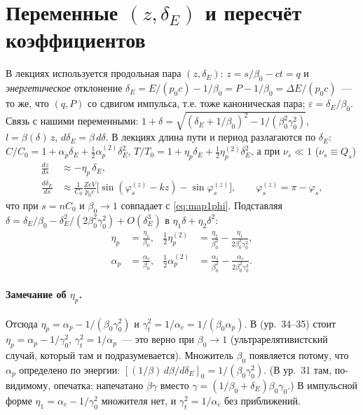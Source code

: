 \documentclass[a4paper,11pt]{article}
\numberwithin{equation}{section}
\begin{document}
\appendix
\section{Переменные $(z,\delta_E)$ и пересчёт коэффициентов}
В лекциях \cite{wolski4,wolski7} используется продольная пара $(z,\delta_E)$: $z=s/\beta_0-ct=q$ и
\emph{энергетическое} отклонение $\delta_E=E/(p_0c)-1/\beta_0=P-1/\beta_0=\Delta E/(p_0c)$~--- то же, что $(q,P)$
со сдвигом импульса, т.е. тоже каноническая пара; $\varepsilon=\delta_E/\beta_0$. Связь с нашими переменными:
$1+\delta=\sqrt{(\delta_E+1/\beta_0)^2-1/(\beta_0^2\gamma_0^2)}$, $l=\beta(\delta)\,z$, $d\delta_E=\beta\,d\delta$.
В лекциях длина пути и период разлагаются по $\delta_E$:
$C/C_0=1+\alpha_p\delta_E+\tfrac12\alpha_p^{(2)}\delta_E^2$, $T/T_0=1+\eta_p\delta_E+\tfrac12\eta_p^{(2)}\delta_E^2$,
а при $\nu_s\ll1$ ($\nu_s\equiv Q_s$)
\[
\begin{aligned}
\frac{dz}{ds}&\approx-\eta_p\,\delta_E,\\
\frac{d\delta_E}{ds}&\approx\frac{1}{C_0}\frac{ZeV}{p_0c}\big[\sin(\varphi_s^{(z)}-kz)-\sin\varphi_s^{(z)}\big],
\qquad \varphi_s^{(z)}=\pi-\varphi_s,
\end{aligned}
\]
что при $s=nC_0$ и $\beta_0\to1$ совпадает с \eqref{eq:map1phi}. Подставляя
$\delta=\delta_E/\beta_0-\delta_E^2/(2\beta_0^2\gamma_0^2)+O(\delta_E^3)$ в $\eta_1\delta+\eta_2\delta^2$:
\[
\begin{aligned}
\eta_p&=\frac{\eta_1}{\beta_0}, & \tfrac12\eta_p^{(2)}&=\frac{\eta_2}{\beta_0^2}-\frac{\eta_1}{2\beta_0^2\gamma_0^2},\\
\alpha_p&=\frac{\alpha_c}{\beta_0}, & \tfrac12\alpha_p^{(2)}&=\frac{\alpha_1}{\beta_0^2}-\frac{\alpha_c}{2\beta_0^2\gamma_0^2}.
\end{aligned}
\]
\paragraph{Замечание об $\eta_p$.} Отсюда $\eta_p=\alpha_p-1/(\beta_0\gamma_0^2)$ и $\gamma_t^2=1/\alpha_c=1/(\beta_0\alpha_p)$.
В \cite{wolski7} (ур.~34--35) стоит $\eta_p=\alpha_p-1/\gamma_0^2$, $\gamma_t^2=1/\alpha_p$~--- это верно при $\beta_0\to1$
(ультрарелятивистский случай, который там и подразумевается). Множитель $\beta_0$ появляется потому, что $\alpha_p$
определено по энергии: $[(1/\beta)\,d\beta/d\delta_E]_0=1/(\beta_0\gamma_0^2)$. (В ур.~31 там, по-видимому, опечатка:
напечатано $\beta\gamma$ вместо $\gamma=(1/\beta_0+\delta_E)\beta_0\gamma_0$.) В импульсной форме
$\eta_1=\alpha_c-1/\gamma_0^2$ множителя нет, и $\gamma_t^2=1/\alpha_c$ без приближений.
\end{document}
